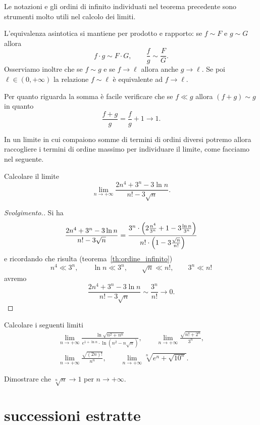 Le notazioni e gli
ordini di infinito individuati nel teorema precedente
sono strumenti molto utili nel calcolo dei limiti.

L'equivalenza asintotica
si mantiene per prodotto e rapporto:
se $f\sim F$ e $g\sim G$ allora
\[
 f \cdot g \sim F \cdot G,
 \qquad
 \frac{f}{g} \sim \frac{F}{G}.
\]
Osserviamo inoltre che se
$f \sim g$ e se $f\to \ell$ allora
anche $g\to \ell$.
Se poi $\ell\in(0,+\infty)$
la relazione $f\sim \ell$ è equivalente ad $f\to \ell$.

Per quanto riguarda la somma
è facile verificare che se $f\ll g$ allora
$(f+g) \sim g$ in quanto
\[
  \frac{f + g}{g} = \frac{f}{g} + 1 \to 1.
\]

In un limite in cui compaiono somme di termini
di ordini diversi potremo allora raccogliere i termini di ordine
massimo per individuare il limite, come facciamo
nel seguente.

\begin{example}
Calcolare il limite
\[
\lim_{n\to+\infty}
\frac{2n^4 + 3^n - 3 \ln n}{n! - 3\sqrt n}.
\]
\end{example}
\begin{proof}[Svolgimento.]
Si ha
\[
\frac{2n^4 + 3^n - 3 \ln n}{n! - 3\sqrt{n}}
= \frac
{3^n \cdot {\left( 2\frac{n^4}{3^n}+ 1 - 3\frac{\ln n}{3^n} \right)}}
{n!\cdot {\left( 1-3\frac{\sqrt n}{n!} \right)}}
\]
e ricordando che risulta (teorema~\ref{th:ordine_infinito})
\[
n^4 \ll 3^n, \qquad
\ln n \ll 3^n, \qquad
\sqrt n \ll n!, \qquad
3^n \ll n!
\]
avremo
\[
\frac{2n^4 + 3^n - 3 \ln n}{n! - 3\sqrt{n}}
\sim \frac{3^n}{n!} \to 0.
\]
\end{proof}


\begin{exercise}
Calcolare i seguenti limiti
\begin{gather*}
  \lim_{n\to +\infty} \frac{\displaystyle \ln\sqrt{n^2+n^n}}
  {\displaystyle e^{1 + \ln n}\cdot \ln(n^2-n\sqrt n)}, \qquad
  \lim_{n\to +\infty} \frac{\sqrt{n! + 2^n}}{3^n}, \\
  \lim_{n\to +\infty} \frac{\sqrt{(2n)!}}{n^n}, \qquad
  \lim_{n\to +\infty} \sqrt[n]{e^n + \sqrt{10^n}}.
\end{gather*}
\end{exercise}

\begin{exercise}
  Dimostrare che $\sqrt[n]{n}\to 1$ per $n\to +\infty$.
\end{exercise}

\section{successioni estratte}

